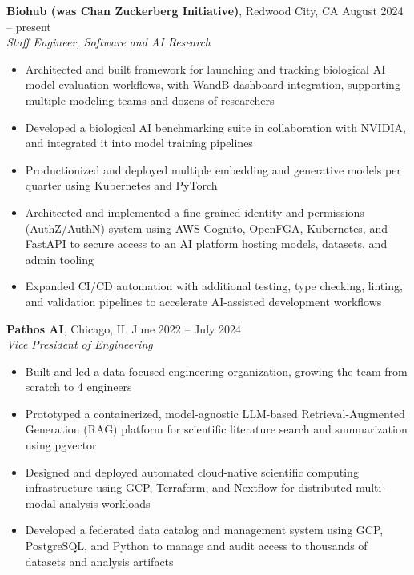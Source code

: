 \documentclass[margin,line]{resume}
\begin{document}
\begin{resume}
    \textbf{Biohub (was Chan Zuckerberg Initiative)}, Redwood City, CA \hfill\vspace{1mm}\hfill August 2024 -- present\\%
    \textsl{Staff Engineer, Software and AI Research}
    \begin{itemize}
    \item Architected and built framework for launching and tracking biological AI model evaluation workflows, with WandB dashboard integration, supporting multiple modeling teams and dozens of researchers
    \item Developed a biological AI benchmarking suite in collaboration with NVIDIA, and integrated it into model training pipelines
    \item Productionized and deployed multiple embedding and generative models per quarter using Kubernetes and PyTorch
    \item Architected and implemented a fine-grained identity and permissions (AuthZ/AuthN) system using AWS Cognito, OpenFGA, Kubernetes, and FastAPI to secure access to an AI platform hosting models, datasets, and admin tooling
    \item Expanded CI/CD automation with additional testing, type checking, linting, and validation pipelines to accelerate AI-assisted development workflows
    \end{itemize}
    
    \textbf{Pathos AI}, Chicago, IL \hfill\vspace{1mm}\hfill June 2022 -- July 2024\\%
    \textsl{Vice President of Engineering}
    \begin{itemize}
    \item Built and led a data-focused engineering organization, growing the team from scratch to 4 engineers
    \item Prototyped a containerized, model-agnostic LLM-based Retrieval-Augmented Generation (RAG) platform for scientific literature search and summarization using pgvector
    \item Designed and deployed automated cloud-native scientific computing infrastructure using GCP, Terraform, and Nextflow for distributed multi-modal analysis workloads
    \item Developed a federated data catalog and management system using GCP, PostgreSQL, and Python to manage and audit access to thousands of datasets and analysis artifacts


\end{itemize}
\end{resume}
\end{document}
